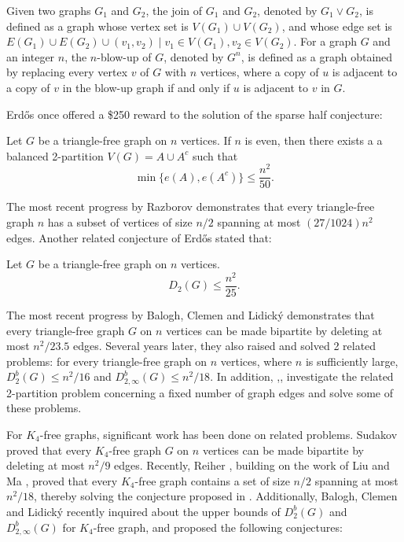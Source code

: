 \documentclass[11pt, oneside]{article}   	%
\begin{document}
Given two graphs $G_1$ and $G_2$, the join of $G_1$ and $G_2$, denoted by $G_1\vee G_2$, is defined as a graph whose vertex set is $V(G_1) \cup V(G_2)$, and whose edge set is $E(G_1) \cup E(G_2) \cup { (v_1, v_2) \mid v_1 \in V(G_1), v_2 \in V(G_2) }$. For a graph $G$ and an integer $n$, the $n$-blow-up of $G$, denoted by $G^n$, is defined as a graph obtained by replacing every vertex $v$ of $G$ with $n$ vertices, where a copy of $u$ is adjacent to a copy of $v$ in the blow-up graph if and only if $u$ is adjacent to $v$ in $G$.  

Erdős once offered a \$250 reward to the solution of the sparse half conjecture:
\begin{Conj}\cite{erdos1988}
Let $G$ be a triangle-free graph on $n$ vertices. If $n$ is even, then there exists a a balanced 2-partition $V(G)=A\cup A^c$ such that
$$\min\{e(A),e(A^c)\}\leq \frac{n^2}{50}.$$
\end{Conj}

The most recent progress by Razborov\cite{razborov2022} demonstrates that every triangle-free graph $n$ has a subset of vertices of size $n/2$ spanning at most $(27/1024)n^2$ edges. Another related conjecture of Erdős stated that:

\begin{Conj}\cite{erdos1997}
    Let $G$ be a triangle-free graph on $n$ vertices.
    $$
    D_2(G)\leq \frac{n^2}{25}.
    $$
\end{Conj}

The most recent progress by Balogh, Clemen and Lidický\cite{balogh2021} demonstrates that every triangle-free graph $G$ on $n$ vertices can be made bipartite by deleting at most $n^2/23.5$ edges. Several years later, they also raised and solved 2 related problems: for every triangle-free graph on $n$ vertices, where $n$ is sufficiently large, $D_2^b(G)\leq n^2/16$ and $D_{2,\infty}^b(G)\leq n^2/18$. In addition, \cite{bollobas1999},\cite{scott2005},\cite{lee2013} investigate the related 2-partition problem concerning a fixed number of graph edges and solve some of these problems.

For $K_4$-free graphs, significant work has been done on related problems.  Sudakov \cite{sudakov2007} proved that every $K_4$-free graph $G$ on $n$ vertices can be made bipartite by deleting at most $n^2/9$ edges. Recently, Reiher \cite{reiher2022}, building on the work of Liu and Ma \cite{liu2022}, proved that every $K_4$-free graph contains a set of size $n/2$ spanning at most $n^2/18$, thereby solving the conjecture proposed in \cite{erdos1994}. Additionally, Balogh, Clemen and Lidický\cite{balogh2023} recently inquired about the upper bounds of $D_2^b(G)$ and $D_{2,\infty}^b(G)$ for $K_4$-free graph, and proposed the following conjectures:
\end{document}
